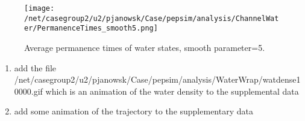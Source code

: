 \documentclass[12pt,letterpaper]{report}
\begin{document}
\begin{enumerate}
	\begin{figure}[H]
	\centering
	\texttt{[image: /net/casegroup2/u2/pjanowsk/Case/pepsim/analysis/ChannelWater/PermanenceTimes\_smooth5.png]}
	\caption{Average permanence times of water states, smooth parameter=5.}
	\end{figure}	

	
	\begin{enumerate}
	\item add the file /net/casegroup2/u2/pjanowsk/Case/pepsim/analysis/WaterWrap/watdense10000.gif which is an animation of the water density to the supplemental data
	\item add some animation of the trajectory to the supplementary data
	\end{enumerate}

	
\end{enumerate}
\end{document}
